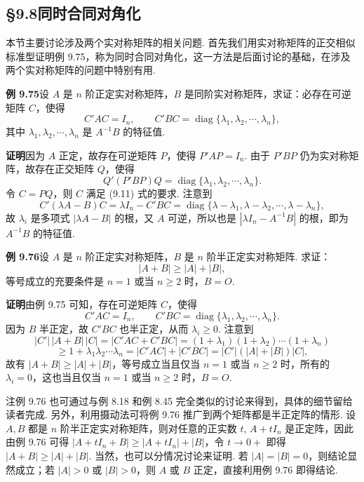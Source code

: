 \documentclass[UTF8,12pt,a4paper,fontset=fandol]{ctexart}
\begin{document}
\subsection*{§9.8\quad 同时合同对角化}

本节主要讨论涉及两个实对称矩阵的相关问题. 首先我们用实对称矩阵的正交相似标准型证明例 9.75，称为同时合同对角化，这一方法是后面讨论的基础，在涉及两个实对称矩阵的问题中特别有用.

\noindent\textbf{例 9.75}\quad 设 $A$ 是 $n$ 阶正定实对称矩阵，$B$ 是同阶实对称矩阵，求证：必存在可逆矩阵 $C$，使得
\begin{equation}
C'AC=I_n,\qquad C'BC=\operatorname{diag}\{\lambda_1,\lambda_2,\cdots,\lambda_n\},
\tag{9.11}
\end{equation}
其中 $\lambda_1,\lambda_2,\cdots,\lambda_n$ 是 $A^{-1}B$ 的特征值.

\noindent\textbf{证明}\quad 因为 $A$ 正定，故存在可逆矩阵 $P$，使得 $P'AP=I_n$. 由于 $P'BP$ 仍为实对称矩阵，故存在正交矩阵 $Q$，使得
\[
Q'(P'BP)Q=\operatorname{diag}\{\lambda_1,\lambda_2,\cdots,\lambda_n\}.
\]
令 $C=PQ$，则 $C$ 满足 (9.11) 式的要求. 注意到
\[
C'(\lambda A-B)C=\lambda I_n-C'BC=\operatorname{diag}\{\lambda-\lambda_1,\lambda-\lambda_2,\cdots,\lambda-\lambda_n\},
\]
故 $\lambda_i$ 是多项式 $|\lambda A-B|$ 的根，又 $A$ 可逆，所以也是 $|\lambda I_n-A^{-1}B|$ 的根，即为 $A^{-1}B$ 的特征值.

\noindent\textbf{例 9.76}\quad 设 $A$ 是 $n$ 阶正定实对称矩阵，$B$ 是 $n$ 阶半正定实对称矩阵. 求证：
\[
|A+B|\ge |A|+|B|,
\]
等号成立的充要条件是 $n=1$ 或当 $n\ge2$ 时，$B=O$.

\noindent\textbf{证明}\quad 由例 9.75 可知，存在可逆矩阵 $C$，使得
\[
C'AC=I_n,\qquad C'BC=\operatorname{diag}\{\lambda_1,\lambda_2,\cdots,\lambda_n\}.
\]
因为 $B$ 半正定，故 $C'BC$ 也半正定，从而 $\lambda_i\ge0$. 注意到
\[
|C'|\,|A+B|\,|C|=|C'AC+C'BC|=(1+\lambda_1)(1+\lambda_2)\cdots(1+\lambda_n)
\]
\[
\ge 1+\lambda_1\lambda_2\cdots\lambda_n=|C'AC|+|C'BC|=|C'|(|A|+|B|)|C|,
\]
故有 $|A+B|\ge|A|+|B|$，等号成立当且仅当 $n=1$ 或当 $n\ge2$ 时，所有的 $\lambda_i=0$，这也当且仅当 $n=1$ 或当 $n\ge2$ 时，$B=O$.

注\quad 例 9.76 也可通过与例 8.18 和例 8.45 完全类似的讨论来得到，具体的细节留给读者完成. 另外，利用摄动法可将例 9.76 推广到两个矩阵都是半正定阵的情形. 设 $A,B$ 都是 $n$ 阶半正定实对称矩阵，则对任意的正实数 $t$, $A+tI_n$ 是正定阵，因此由例 9.76 可得 $|A+tI_n+B|\ge |A+tI_n|+|B|$，令 $t\to0+$ 即得 $|A+B|\ge |A|+|B|$. 当然，也可以分情况讨论来证明. 若 $|A|=|B|=0$，则结论显然成立；若 $|A|>0$ 或 $|B|>0$，则 $A$ 或 $B$ 正定，直接利用例 9.76 即得结论.
\end{document}
